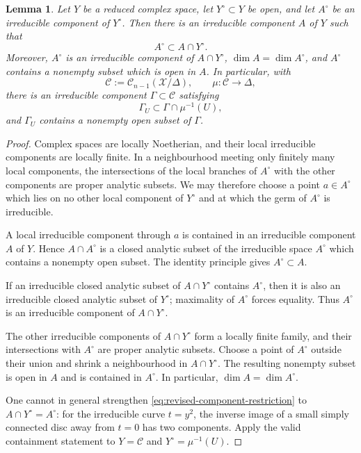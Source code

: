 \documentclass[11pt]{amsart}
\numberwithin{equation}{section}
\theoremstyle{plain}
\newtheorem{lemma}[thm]{Lemma}
\theoremstyle{definition}
\newcommand{\cC}{\mathcal C}
\newcommand{\cX}{\mathcal X}
\begin{document}
\begin{lemma}\label{lem:revised-global-component}
Let $Y$ be a reduced complex space, let $Y^\circ\subset Y$ be open, and let
$A^\circ$ be an irreducible component of $Y^\circ$.  Then there is an irreducible component $A$ of $Y$ such that
\begin{equation}\label{eq:revised-component-restriction}
 A^\circ\subset A\cap Y^\circ.
\end{equation}
Moreover, $A^\circ$ is an irreducible component of $A\cap Y^\circ$,
$\dim A=\dim A^\circ$, and $A^\circ$ contains a nonempty subset which is
open in $A$.  In particular, with
\[
 \mathscr C:=\cC_{n-1}(\cX/\Delta),\qquad
 \mu:\mathscr C\to\Delta,
\]
there is an irreducible component $\Gamma\subset\mathscr C$ satisfying
\begin{equation*}
 \Gamma_U\subset\Gamma\cap\mu^{-1}(U),
\end{equation*}
and $\Gamma_U$ contains a nonempty open subset of $\Gamma$.
\end{lemma}

\begin{proof}
Complex spaces are locally Noetherian, and their local irreducible
components are locally finite.  In a neighbourhood meeting only finitely
many local components, the intersections of the local branches of
$A^\circ$ with the other components are proper analytic subsets.  We may
therefore choose a point $a\in A^\circ$ which lies on no other local
component of $Y^\circ$ and at which the germ of $A^\circ$ is irreducible.

A local irreducible component through $a$ is
contained in an irreducible component $A$ of $Y$.  Hence
$A\cap A^\circ$ is a closed analytic subset of the irreducible space
$A^\circ$ which contains a nonempty open subset.  The identity principle
gives $A^\circ\subset A$.

If an irreducible closed analytic subset of
$A\cap Y^\circ$ contains $A^\circ$, then it is also an irreducible closed
analytic subset of $Y^\circ$; maximality of $A^\circ$ forces equality.
Thus $A^\circ$ is an irreducible component of $A\cap Y^\circ$.

The other irreducible components of $A\cap Y^\circ$ form a locally finite
family, and their intersections with $A^\circ$ are proper analytic
subsets.  Choose a point of $A^\circ$ outside their union and shrink a
neighbourhood in $A\cap Y^\circ$.  The resulting nonempty subset is open
in $A$ and is contained in $A^\circ$.  In particular,
$\dim A=\dim A^\circ$.

One cannot in general strengthen \eqref{eq:revised-component-restriction} to
$A\cap Y^\circ=A^\circ$: for the irreducible curve $t=y^2$, the inverse
image of a small simply connected disc away from $t=0$ has two components.
Apply the valid containment statement to $Y=\mathscr C$ and
$Y^\circ=\mu^{-1}(U)$.
\end{proof}
\end{document}
